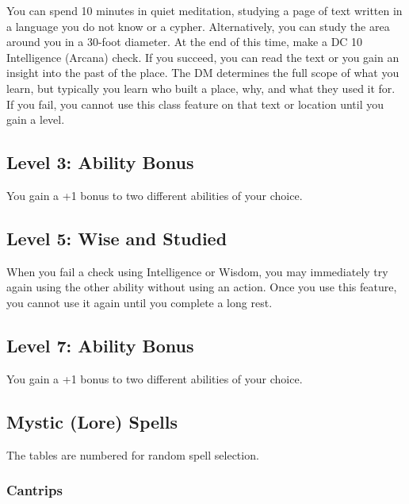 \documentclass[12pt,letterpaper,twocolumn,openany,nodeprecatedcode,bg=none]{dndbook}
\let\oldsubsection\subsection
\renewcommand{\subsection}[1]{%
  \needspace{5\baselineskip}%
  \oldsubsection{#1}%
}
\begin{document}
You can spend 10 minutes in quiet meditation, studying a page of text
written in a language you do not know or a cypher. Alternatively, you
can study the area around you in a 30-foot diameter. At the end of this
time, make a DC 10 Intelligence (Arcana) check. If you succeed, you can
read the text or you gain an insight into the past of the place. The DM
determines the full scope of what you learn, but typically you learn who
built a place, why, and what they used it for. If you fail, you cannot
use this class feature on that text or location until you gain a level.

\subsection{Level 3: Ability Bonus}\label{level-3-ability-bonus}

You gain a +1 bonus to two different abilities of your choice.

\newpage

\subsection{Level 5: Wise and Studied}\label{level-5-wise-and-studied}

When you fail a check using Intelligence or Wisdom, you may immediately
try again using the other ability without using an action. Once you use
this feature, you cannot use it again until you complete a long rest.

\subsection{Level 7: Ability Bonus}\label{level-7-ability-bonus}

You gain a +1 bonus to two different abilities of your choice.

\subsection{Mystic (Lore) Spells}\label{mystic-lore-spells}

The tables are numbered for random spell selection.

\subsubsection{Cantrips}\label{cantrips}

\end{document}
